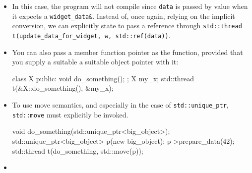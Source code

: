 \documentclass[11pt, a4paper]{article}
\theoremstyle{definition}
\theoremstyle{remark}
\newcommand{\code}[1]{\lstinline|#1|}
\begin{document}
\begin{itemize}
\begin{cppcode}
void update_data_for_widget(widget_id w, widget_data& data);
void oops_again(widget_id w) {
    widget_data data;
    std::thread t(update_data_for_widget, w, data);
    display_status();
    t.join();
    process_widget_data(data);
}
\end{cppcode}
    \item In this case, the program will not compile since \code{data} is passed by value when it expects a \code{widget_data&}. Instead of,
    once again, relying on the implicit conversion, we can explicitly state to pass a reference through \code{std::thread t(update_data_for_widget, w, std::ref(data))}.
    \item You can also pass a member function pointer as the function, provided that you supply a suitable a suitable object pointer with it:
\begin{cppcode}
class X {
public: 
    void do_something();
};
X my_x;
std::thread t(&X::do_something(), &my_x);
\end{cppcode}
    \item To use move semantics, and especially in the case of \code{std::unique_ptr}, \code{std::move} must explicitly be invoked. 
\begin{cppcode}
void do_something(std::unique_ptr<big_object>);
std::unique_ptr<big_object> p(new big_object);
p->prepare_data(42);
std::thread t(do_something, std::move(p));
\end{cppcode}
    \item 

\end{itemize}
\end{document}
